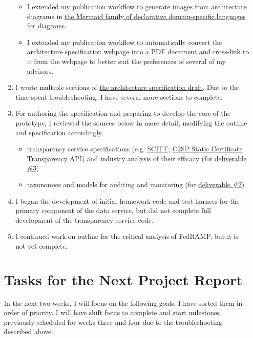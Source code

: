 \documentclass{jdf}
\begin{document}
\begin{enumerate}
\begin{itemize}
            \item I extended my publication workflow to generate images from architecture diagrams in \hyperlink{https://mermaid.js.org/}{the Mermaid family of declarative domain-specific languages for diagrams}.
            \item I extended my publication workflow to automatically convert the architecture specification webpage into a PDF document and cross-link to it from the webpage to better suit the preferences of several of my advisors.
        \end{itemize}
    \item I wrote multiple sections of \hyperlink{https://add-architecture-draft--conmotion.netlify.app/architecture.html}{the architecture specification draft}. Due to the time spent troubleshooting, I have several more sections to complete.
    \item For authoring the specification and preparing to develop the core of the prototype, I reviewed the sources below in more detail, modifying the outline and specification accordingly.
        \begin{itemize}
            \item transparency service specifications (e.g. \hyperlink{https://datatracker.ietf.org/doc/draft-ietf-scitt-architecture/}{SCITT}; \hyperlink{https://c2sp.org/static-ct-api}{C2SP Static Certificate Transparency API}) and industry analysis of their efficacy (for  \hyperlink{https://github.com/aj-stein/practicum_proposal/blob/main/paper.pdf}{deliverable \#3})
            \item taxonomies and models for auditing and monitoring (for  \hyperlink{https://github.com/aj-stein/practicum_proposal/blob/main/paper.pdf}{deliverable \#2})
        \end{itemize}
    \item I began the development of initial framework code and test harness for the primary component of the data service, but did not complete full development of the transparency service code.
    \item I continued work on outline for the critical analysis of FedRAMP, but it is not yet complete.
\end{enumerate}

\section*{Tasks for the Next Project Report}

In the next two weeks, I will focus on the following goals. I have sorted them in order of priority. I will have shift focus to complete and start milestones previously scheduled for weeks three and four due to the troubleshooting described above.
\end{document}
